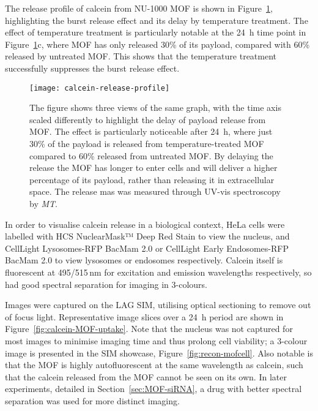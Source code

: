 The release profile of calcein from NU-1000 MOF is shown in Figure~\ref{fig:calcein-release-profile}, highlighting the burst release effect and its delay by temperature treatment. 
The effect of temperature treatment is particularly notable at the \SI{24}{\hour} time point in Figure~\ref{fig:calcein-release-profile}c, where MOF has only released 30\% of its payload, compared with 60\% released by untreated MOF.
This shows that the temperature treatment successfully suppresses the burst release effect. 
 
\begin{figure}[htbp!]
\centering
\texttt{[image: calcein-release-profile]}
\caption[MOFs: Payload release is delayed by temperature treatment]{ The figure shows three views of the same graph, with the time axis scaled differently to highlight the delay of payload release from MOF. The effect is particularly noticeable after \SI{24}{\hour}, where just 30\% of the payload is released from temperature-treated MOF compared to 60\% released from untreated MOF. By delaying the release the MOF has longer to enter cells and will deliver a higher percentage of its payload, rather than releasing it in extracellular space. The release mas was measured through UV-vis spectroscopy by \textit{MT}. }
\label{fig:calcein-release-profile}
\end{figure}

In order to visualise calcein release in a biological context, HeLa cells were labelled with HCS NuclearMask™ Deep Red Stain to view the nucleus, and CellLight Lysosomes-RFP BacMam 2.0 or CellLight Early Endosomes-RFP BacMam 2.0 to view lysosomes or endosomes respectively. 
Calcein itself is fluorescent at 495/515\,\si{\nano\meter} for excitation and emission wavelengths respectively, so had good spectral separation for imaging in 3-colours. %

Images were captured on the LAG SIM, utilising optical sectioning to remove out of focus light. 
Representative image slices over a \SI{24}{\hour} period are shown in Figure~\ref{fig:calcein-MOF-uptake}. 
Note that the nucleus was not captured for most images to minimise imaging time and thus prolong cell viability; a 3-colour image is presented in the SIM showcase, Figure~\ref{fig:recon-mofcell}. 
Also notable is that the MOF is highly autofluorescent at the same wavelength as calcein, such that the calcein released from the MOF cannot be seen on its own. 
In later experiments, detailed in Section~\ref{sec:MOF-siRNA}, a drug with better spectral separation was used for more distinct imaging.

